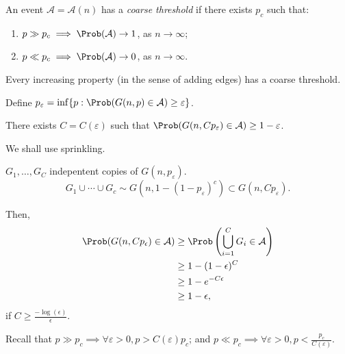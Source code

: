 \begin{defn}
	An event $\mathcal A = \mathcal A(n)$ has a \emph{coarse threshold} if there exists $p_c$ such that:
	\begin{enumerate}[label = \textbullet] 
		\item $p \gg p_c \implies \Prob(\mathcal A) \to 1$, as  $n \to \infty$;
		\item $p \ll p_c \implies \Prob(\mathcal A) \to 0$, as  $n \to \infty$.
	\end{enumerate}
\end{defn}

\begin{thm}
	Every increasing property (in the sense of adding edges) has a coarse threshold.
\end{thm}

\begin{sk}
	Define $p_\varepsilon = \inf \{p : \Prob(G(n, p) \in \mathcal A) \ge \varepsilon\}$.

	\begin{prop}\label{prop:bt-1980}
		 There exists $C = C(\varepsilon)$ such that $\Prob(G(n, Cp_\varepsilon) \in \mathcal A) \ge 1-\varepsilon$.
	\end{prop}
	\begin{sk}
		We shall use sprinkling.

		$G_1, \dots, G_C$ indepentent copies of $G(n, p_\varepsilon)$. \[
			G_1 \cup \cdots \cup G_c \sim G\left(n, 1-(1-p_\varepsilon)^c\right) \subset G(n, Cp_\varepsilon).
		\]

		Then, \begin{align*}
			\Prob(G(n, Cp_\epsilon) \in \mathcal A) &\ge \Prob\left( \bigcup_{i=1}^C G_i \in \mathcal A \right)\\
			&\ge 1 - (1 - \epsilon)^C\\
			&\ge 1 - e^{-C\epsilon}\\
			&\ge 1 - \epsilon,
		\end{align*}
		if $C \ge \frac{-\log(\epsilon)}{\epsilon}$.
	\end{sk}

	Recall that $p \gg p_c \implies \forall \varepsilon > 0, p > C(\varepsilon)p_c$; and $p \ll p_c \implies \forall \varepsilon > 0, p < \frac{p_c}{C(\varepsilon)}$.
\end{sk}

